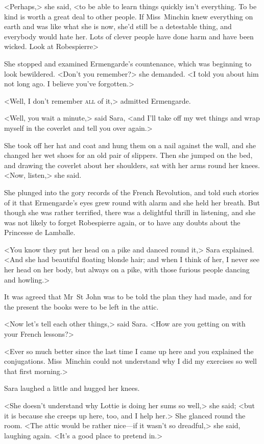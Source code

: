 <Perhaps,> she said, <to be able to learn things quickly isn't everything. To be kind is worth a great deal to other people. If Miss~Minchin knew everything on earth and was like what she is now, she'd still be a detestable thing, and everybody would hate her. Lots of clever people have done harm and have been wicked. Look at Robespierre\longdash>

She stopped and examined Ermengarde's countenance, which was beginning to look bewildered. <Don't you remember?> she demanded. <I told you about him not long ago. I believe you've forgotten.>

<Well, I don't remember \textsc{all} of it,> admitted Ermengarde.

<Well, you wait a minute,> said Sara, <and I'll take off my wet things and wrap myself in the coverlet and tell you over again.>

She took off her hat and coat and hung them on a nail against the wall, and she changed her wet shoes for an old pair of slippers. Then she jumped on the bed, and drawing the coverlet about her shoulders, sat with her arms round her knees. <Now, listen,> she said.

She plunged into the gory records of the French Revolution, and told such stories of it that Ermengarde's eyes grew round with alarm and she held her breath. But though she was rather terrified, there was a delightful thrill in listening, and she was not likely to forget Robespierre again, or to have any doubts about the Princesse de Lamballe.

<You know they put her head on a pike and danced round it,> Sara explained. <And she had beautiful floating blonde hair; and when I think of her, I never see her head on her body, but always on a pike, with those furious people dancing and howling.>

It was agreed that Mr~St John was to be told the plan they had made, and for the present the books were to be left in the attic.

<Now let's tell each other things,> said Sara. <How are you getting on with your French lessons?>

<Ever so much better since the last time I came up here and you explained the conjugations. Miss~Minchin could not understand why I did my exercises so well that first morning.>

Sara laughed a little and hugged her knees.

<She doesn't understand why Lottie is doing her sums so well,> she said; <but it is because she creeps up here, too, and I help her.> She glanced round the room. <The attic would be rather nice—if it wasn't so dreadful,> she said, laughing again. <It's a good place to pretend in.>

